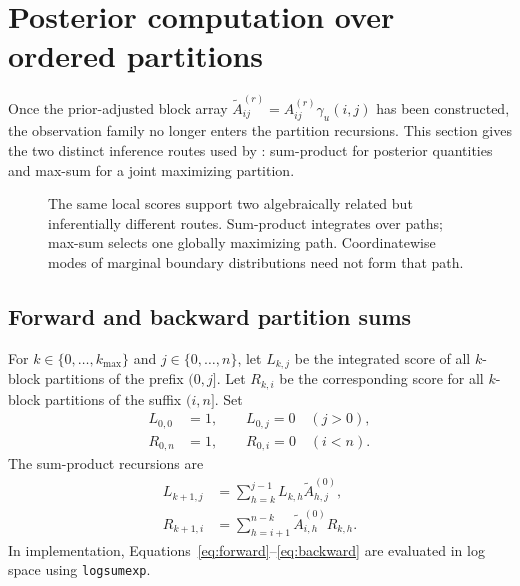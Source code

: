 \section{Posterior computation over ordered partitions}
\label{sec:exact-inference}

Once the prior-adjusted block array
$\widetilde A^{(r)}_{ij}=A^{(r)}_{ij}\gamma_u(i,j)$ has been constructed, the observation family no longer enters the partition recursions. This section gives the two distinct inference routes used by \BayesBreak: sum-product for posterior quantities and max-sum for a joint maximizing partition.

\begin{figure}[t]
  \centering
  \resizebox{0.91\textwidth}{!}{}
  \caption{The same local scores support two algebraically related but inferentially different routes. Sum-product integrates over paths; max-sum selects one globally maximizing path. Coordinatewise modes of marginal boundary distributions need not form that path.}
  \label{fig:semiring-routes}
\end{figure}

\subsection{Forward and backward partition sums}
For $k\in\{0,\ldots,k_{\max}\}$ and $j\in\{0,\ldots,n\}$, let $L_{k,j}$ be the integrated score of all $k$-block partitions of the prefix $(0,j]$. Let $R_{k,i}$ be the corresponding score for all $k$-block partitions of the suffix $(i,n]$. Set
\begin{align*}
L_{0,0}&=1,\qquad L_{0,j}=0\quad(j>0),\\
R_{0,n}&=1,\qquad R_{0,i}=0\quad(i<n).
\end{align*}
The sum-product recursions are
\begin{align}
L_{k+1,j}&=\sum_{h=k}^{j-1}L_{k,h}\widetilde A^{(0)}_{h,j},
\label{eq:forward}\\
R_{k+1,i}&=\sum_{h=i+1}^{n-k}\widetilde A^{(0)}_{i,h}R_{k,h}.
\label{eq:backward}
\end{align}
In implementation, Equations~\eqref{eq:forward}--\eqref{eq:backward} are evaluated in log space using \texttt{logsumexp}.

